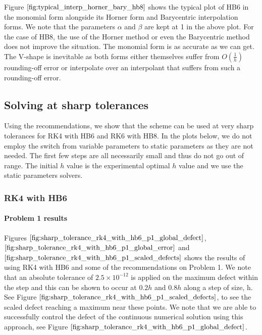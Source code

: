 Figure $\ref{fig:typical_interp_horner_bary_hb8}$ shows the typical plot of HB6 in the monomial form alongside its Horner form and Barycentric interpolation forms. We note that the parameters $\alpha$ and $\beta$ are kept at 1 in the above plot. For the case of HB8, the use of the Horner method or even the Barycentric method does not improve the situation. The monomial form is as accurate as we can get. The V-shape is inevitable as both forms either themselves suffer from $O(\frac{1}{h})$ rounding-off error or interpolate over an interpolant that suffers from such a rounding-off error.

\subsection{Solving at sharp tolerances}
\label{section:solving_at_sharp_tolerances}
Using the recommendations, we show that the scheme can be used at very sharp tolerances for RK4 with HB6 and RK6 with HB8. In the plots below, we do not employ the switch from variable parameters to static parameters as they are not needed. The first few steps are all necessarily small and thus do not go out of range. The initial $h$ value is the experimental optimal $h$ value and we use the static parameters solvers. 

\subsubsection{RK4 with HB6}
\paragraph{Problem 1 results}
Figures $\ref{fig:sharp_tolerance_rk4_with_hb6_p1_global_defect}$, $\ref{fig:sharp_tolerance_rk4_with_hb6_p1_global_error}$ and $\ref{fig:sharp_tolerance_rk4_with_hb6_p1_scaled_defects}$ shows the results of using RK4 with HB6 and some of the recommendations on Problem 1. We note that an absolute tolerance of $2.5 \times 10^{-12}$ is applied on the maximum defect within the step and this can be shown to occur at $0.2h$ and $0.8h$ along a step of size, h. See Figure $\ref{fig:sharp_tolerance_rk4_with_hb6_p1_scaled_defects}$, to see the scaled defect reaching a maximum near these points. We note that we are able to successfully control the defect of the continuous numerical solution using this approach, see Figure $\ref{fig:sharp_tolerance_rk4_with_hb6_p1_global_defect}$. 

